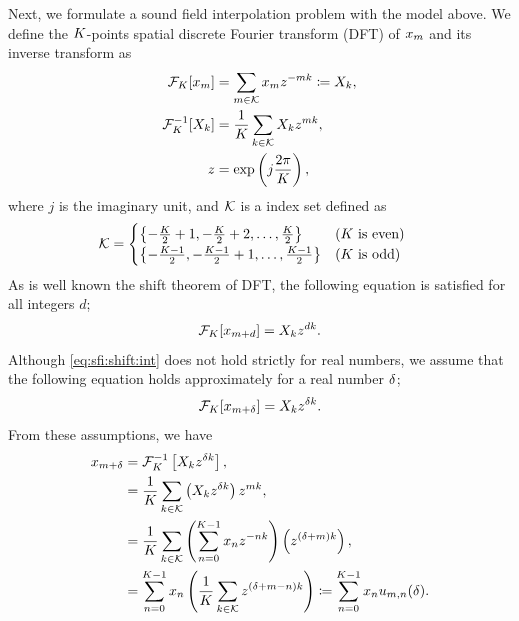 \documentclass[sip,biber]{now-journal}
\newcommand{\todo}[1]{\textcolor{red}{#1}}
\begin{document}
Next, we formulate a sound field interpolation problem with the model above.
We define the $K$-points spatial discrete Fourier transform (DFT) of $x _{m}$ and its inverse transform as
\begin{align}
  \mathcal{F} _{K} [x _{m}] &= \sum _{m \in \mathcal{K}} x _{m} z ^{-mk} \coloneqq X _{k},\\
  \mathcal{F} _{K} ^{-1} [X _{k}] &= \frac{1}{K} \sum _{k \in \mathcal{K}} X _{k} z ^{mk}, \\
  z &= \exp \left(j\frac{2\pi}{K}\right),
\end{align}
where $j$ is the imaginary unit,
and $\mathcal{K}$ is a index set defined as%
\begin{align}
  \mathcal{K} &=
  \begin{cases}
    \left\{-\frac{K}{2} + 1, -\frac{K}{2} + 2, \dots, \frac{K}{2}\right\} & \text{($K$ is even)} \\
    \left\{-\frac{K - 1}{2}, -\frac{K - 1}{2} + 1, \dots, \frac{K - 1}{2}\right\} & \text{($K$ is odd)}
  \end{cases}
\end{align}
As is well known the shift theorem of DFT, the following equation is satisfied for all integers $d$;
\begin{equation}
  \dft _{\Src} [\sfcma _{\mic + d}] = \Sfcma _{\src} \twid ^{d \src}.%
  \label{eq:sfi:shift:int}
\end{equation}
Although \eqref{eq:sfi:shift:int} does not hold strictly for real numbers, we assume that the following equation holds approximately for a real number $\delta$;
\begin{equation}
  \dft _{\Src} [\sfcma _{\mic + \rotSmpl}] = \Sfcma _{\src} \twid ^{\rotSmpl \src}.%
  \label{eq:sfi:shift:dft}
\end{equation}
From these assumptions, we have
\begin{align}
  x _{m + \delta} &= \mathcal{F} _{K} ^{-1} \left[X _{k} z ^{\delta k}\right], \\
                            &= \frac{1}{K} \sum _{k \in \mathcal{K}} \left(X _{k}z ^{\delta k} \right) z ^{mk}, \\
                            &= \frac{1}{K} \sum _{k \in \mathcal{K}} \left(\sum _{n=0} ^{K - 1} x _{n} z ^{-nk}\right) \left( z ^{(\delta + m)k} \right), \\
                            &= \sum _{n = 0} ^{K - 1} x _{n} \left( \frac{1}{K} \sum _{k \in \mathcal{K}} z ^{(\delta + m - n)k} \right)
                            \coloneqq \sum _{n = 0} ^{K - 1} x _{n} u _{m, n}(\delta) \label{eq:sfi:elem}.
\end{align}
\end{document}
